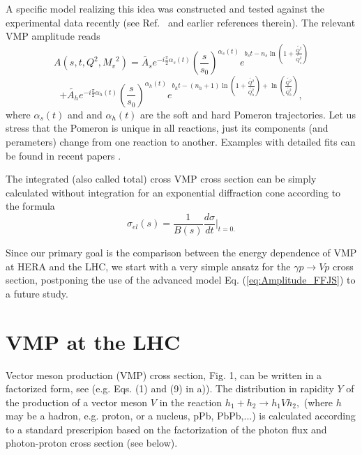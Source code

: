\documentclass[12pt]{article}
\begin{document}
A specific model realizing this idea was constructed and tested against the experimental data recently (see
Ref.~\cite{FFJS} and earlier references therein). The relevant VMP amplitude reads 
  $$
   A(s,t,Q^2,{M_v}^2)= \widetilde{A_s}e^{-i\frac{\pi}{2}\alpha_s(t)}\left(\frac{s}{s_{0}}\right)^{\alpha_s(t)}
    e^{b_st - n_s\ln{\left(1+\frac{\widetilde{Q^2}}{\widetilde{Q_s^2}}\right)}}
  $$
  \begin{equation}
  +\widetilde{A_h}e^{-i\frac{\pi}{2}\alpha_h(t)}\left(\frac{s}{s_{0}}\right)^{\alpha_h(t)}
    e^{b_ht - (n_h+1)\ln{\left(1+\frac{\widetilde{Q^2}}{\widetilde{Q_h^2}}\right)}
    +\ln{\left(\frac{\widetilde{Q^2}}{\widetilde{Q_h^2}}\right)} },
    \label{eq:Amplitude_FFJS}
    \end{equation}
 where  $\alpha_s(t)$ and and $\alpha_h(t)$ are the soft and hard Pomeron trajectories. Let us 
stress that the Pomeron is unique in all reactions, just its components (and perameters) change from one reaction
to another. Examples with detailed fits can be found in recent papers \cite{FFJS}.

The integrated (also called total) cross VMP cross section can be simply calculated without integration for an exponential diffraction cone according to the formula
$$\sigma_{el}(s)=\frac{1}{B(s)}\frac{d\sigma}{dt}\biggr\rvert_{t=0.}$$ 

Since our primary goal is the comparison between the energy dependence of VMP at HERA and the LHC, we start with a very simple ansatz for the $\gamma p\rightarrow Vp$ cross section, postponing the use of the advanced model  
Eq. (\ref{eq:Amplitude_FFJS}) to a future study.

\section{VMP at the LHC} 

Vector meson production (VMP) cross section, Fig. 1, can be written in a factorized form, see \cite{Brazil, Review} (e.g. Eqs. (1) and (9) in \cite{Brazil}a)).
The distribution in rapidity $Y$ of the production of a vector meson $V$ in the reaction $h_1+h_2\rightarrow h_1Vh_2,$ (where $h$ may be a hadron, e.g. proton, or a nucleus, pPb, PbPb,...) is calculated according to a standard prescripion based on the factorization of the photon flux and photon-proton cross section (see below).
\end{document}
